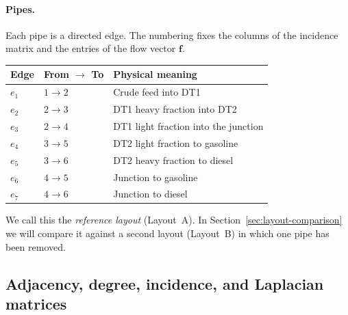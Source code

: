 \documentclass[11pt,a4paper]{article}
\newcommand{\vect}[1]{\mathbf{#1}}
\begin{document}
\paragraph{Pipes.}
Each pipe is a directed edge. The numbering fixes the columns of the
incidence matrix and the entries of the flow vector $\vect{f}$.
\begin{center}
\begin{tabular}{@{}lll@{}}
\toprule
Edge & From $\to$ To & Physical meaning \\
\midrule
$e_1$ & $1 \to 2$ & Crude feed into DT1 \\
$e_2$ & $2 \to 3$ & DT1 heavy fraction into DT2 \\
$e_3$ & $2 \to 4$ & DT1 light fraction into the junction \\
$e_4$ & $3 \to 5$ & DT2 light fraction to gasoline \\
$e_5$ & $3 \to 6$ & DT2 heavy fraction to diesel \\
$e_6$ & $4 \to 5$ & Junction to gasoline \\
$e_7$ & $4 \to 6$ & Junction to diesel \\
\bottomrule
\end{tabular}
\end{center}
We call this the \emph{reference layout} (Layout~A). In
Section~\ref{sec:layout-comparison} we will compare it against a second
layout (Layout~B) in which one pipe has been removed.

\subsection{Adjacency, degree, incidence, and Laplacian matrices}
\label{sec:refinery-matrices}
\end{document}
